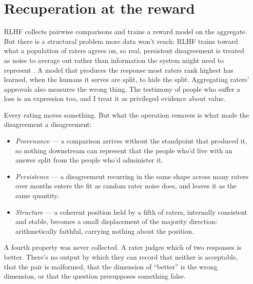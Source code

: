 \section{Recuperation at the reward}
\label{sec:23.5}
RLHF collects pairwise comparisons and trains a reward model on the aggregate. But there is a structural problem more data won't reach: RLHF trains toward what a population of raters agrees on, so real, persistent disagreement is treated as noise to average out rather than information the system might need to represent \autocite{casper2023open}. A model that produces the response most raters rank highest has learned, when the humans it serves are split, to hide the split. Aggregating raters' approvals also measures the wrong thing.
The testimony of people who suffer a loss is an expression too, and I treat it as privileged evidence about value.

Every rating moves something. But what the operation removes is what made the disagreement a disagreement:

\begin{itemize}
\item \emph{Provenance} — a comparison arrives without the standpoint that produced it, so nothing downstream can represent that the people who'd live with an answer split from the people who'd administer it.
\item \emph{Persistence} — a disagreement recurring in the same shape across many raters over months enters the fit as random rater noise does, and leaves it as the same quantity.
\item \emph{Structure} — a coherent position held by a fifth of raters, internally consistent and stable, becomes a small displacement of the majority direction: arithmetically faithful, carrying nothing about the position.
\end{itemize}

A fourth property was never collected. A rater judges which of two responses is better. There's no output by which they can record that neither is acceptable, that the pair is malformed, that the dimension of “better” is the wrong dimension, or that the question presupposes something false.

